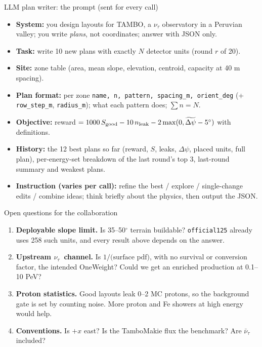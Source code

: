 \documentclass[aspectratio=169,11pt]{beamer}
\newcommand{\nut}{$\nu_\tau$}
\begin{document}
\begin{frame}{LLM plan writer: the prompt (sent for every call)}
  \small
  \begin{itemize}
    \item \textbf{System:} you design layouts for TAMBO, a $\nu_\tau$ observatory in a Peruvian valley; you write \emph{plans}, not coordinates; answer with JSON only.
    \item \textbf{Task:} write 10 new plans with exactly $N$ detector units (round $r$ of 20).
    \item \textbf{Site:} zone table (area, mean slope, elevation, centroid, capacity at 40 m spacing).
    \item \textbf{Plan format:} per zone \texttt{name, n, pattern, spacing\_m, orient\_deg} (+ \texttt{row\_step\_m}, \texttt{radius\_m}); what each pattern does; $\sum n = N$.
    \item \textbf{Objective:} reward $=1000\,S_{\rm good}-10\,n_{\rm leak}-2\max(0,\widetilde{\Delta\psi}-5^\circ)$ with definitions.
    \item \textbf{History:} the 12 best plans so far (reward, $S$, leaks, $\Delta\psi$, placed units, full plan), per-energy-set breakdown of the last round's top 3, last-round summary and weakest plans.
    \item \textbf{Instruction (varies per call):} refine the best / explore / single-change edits / combine ideas; think briefly about the physics, then output the JSON.
  \end{itemize}
\end{frame}

\begin{frame}{Open questions for the collaboration}
  \begin{enumerate}
    \item \textbf{Deployable slope limit.} Is 35--50$^\circ$ terrain buildable? \texttt{official125} already uses 258 such units, and every result above depends on the answer.
    \item \textbf{Upstream \nut\ channel.} Is $1/\text{(surface pdf)}$, with no survival or conversion factor, the intended OneWeight? Could we get an enriched production at 0.1--10 PeV?
    \item \textbf{Proton statistics.} Good layouts leak 0--2 MC protons, so the background gate is set by counting noise. More proton and Fe showers at high energy would help.
    \item \textbf{Conventions.} Is $+x$ east? Is the TamboMakie flux the benchmark? Are $\bar\nu_\tau$ included?
  \end{enumerate}
\end{frame}
\end{document}
